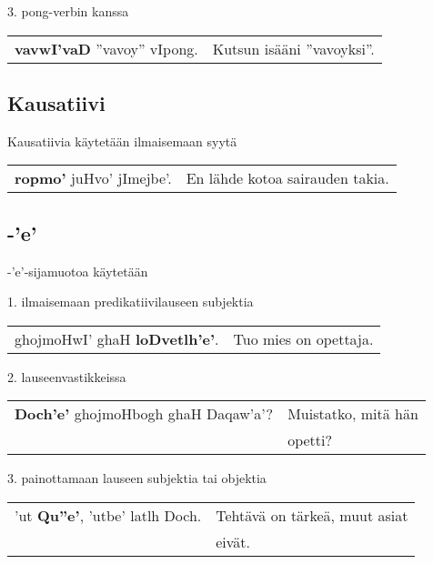 \documentclass{book}
\begin{document}
3. pong-verbin kanssa

\begin{tabular}{l l}
    \textbf{vavwI'vaD} ''vavoy'' vIpong. & Kutsun isääni ''vavoyksi''. \\
\end{tabular}

\subsection{Kausatiivi}

Kausatiivia käytetään ilmaisemaan syytä

\begin{tabular}{l l}
    \textbf{ropmo'} juHvo' jImejbe'. & En lähde kotoa sairauden takia. \\
\end{tabular}

\subsection{-'e'}

-'e'-sijamuotoa käytetään

1. ilmaisemaan predikatiivilauseen subjektia

\begin{tabular}{l l}
    ghojmoHwI' ghaH \textbf{loDvetlh'e'}. & Tuo mies on opettaja. \\
\end{tabular}

2. lauseenvastikkeissa

\begin{tabular}{l l}
    \textbf{Doch'e'} ghojmoHbogh ghaH Daqaw'a'? & Muistatko, mitä hän \\
    & opetti? \\
\end{tabular}

3. painottamaan lauseen subjektia tai objektia

\begin{tabular}{l l}
    'ut \textbf{Qu''e'}, 'utbe' latlh Doch. & Tehtävä on tärkeä, muut asiat \\
    & eivät. \\
\end{tabular}

%
\end{document}
